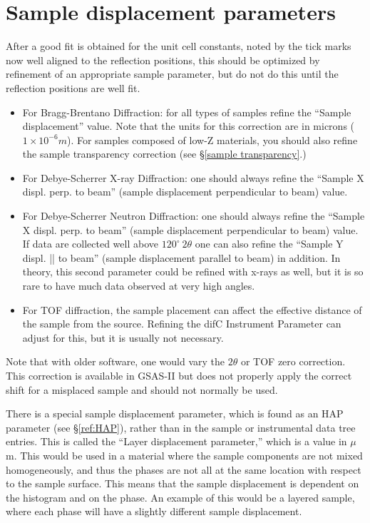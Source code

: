 \section{Sample displacement parameters}\label{ref:SampleDisplacement}
After a good fit is obtained for the unit cell constants, noted by the tick marks now well aligned to the reflection positions, this should be optimized by refinement of an appropriate sample parameter, but do not do this until the reflection positions are well fit. 
\begin{itemize}
    \item For Bragg-Brentano Diffraction: for all types of samples refine the ``Sample displacement'' value. Note that the units for this correction are in microns ($1 \times 10^{-6} m$). For samples composed of low-Z materials, you should also refine the sample transparency correction (see \S\ref{sample transparency}.)

\item For Debye-Scherrer X-ray Diffraction: one should always refine the ``Sample X displ. perp. to beam'' (sample displacement perpendicular to beam) value. 

\item For Debye-Scherrer Neutron Diffraction: one should always refine the ``Sample X displ. perp. to beam'' (sample displacement perpendicular to beam) value. If data are collected well above $120^\circ\ 2\theta$ one can also refine the ``Sample Y displ. || to beam'' (sample displacement parallel to beam) in addition. In theory, this second parameter could be refined with x-rays as well, but it is so rare to have much data observed at very high angles.

\item For TOF diffraction, the sample placement can affect the effective distance of the sample from the source. Refining the difC Instrument Parameter can adjust for this, but it is usually not necessary.  
\end{itemize}

Note that with older software, one would vary the $2\theta$ or TOF zero correction. This correction is available in GSAS-II but does not properly apply the correct shift for a misplaced sample and should not normally be used. 

There is a special sample displacement parameter, which is found as an HAP parameter (see \S\ref{ref:HAP}), rather than in the sample or instrumental data tree entries. This is called the ``Layer displacement parameter,'' which is a value in $\mu$m. This would be used in a material where the sample components are not mixed homogeneously, and thus the phases are not all at the same location with respect to the sample surface. This means that the sample displacement is dependent on the histogram and on the phase. An example of this would be a layered sample, where each phase will have a slightly different sample displacement.

